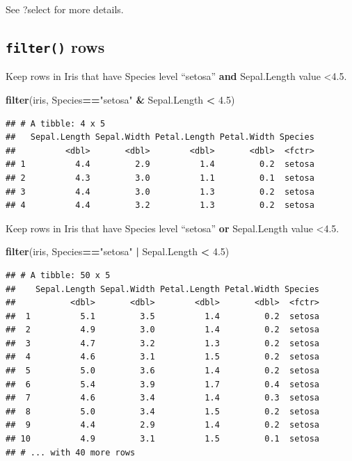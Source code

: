 \documentclass[]{book}
\newenvironment{Shaded}{\begin{snugshade}}{\end{snugshade}}
\newcommand{\KeywordTok}[1]{\textcolor[rgb]{0.13,0.29,0.53}{\textbf{#1}}}
\newcommand{\FloatTok}[1]{\textcolor[rgb]{0.00,0.00,0.81}{#1}}
\newcommand{\StringTok}[1]{\textcolor[rgb]{0.31,0.60,0.02}{#1}}
\newcommand{\OperatorTok}[1]{\textcolor[rgb]{0.81,0.36,0.00}{\textbf{#1}}}
\newcommand{\NormalTok}[1]{#1}
\begin{document}
See ?select for more details.

\subsection{\texorpdfstring{\texttt{filter()}
rows}{filter() rows}}\label{filter-rows}

Keep rows in Iris that have Species level ``setosa'' \textbf{and}
Sepal.Length value \textless{}4.5.

\begin{Shaded}
\begin{Highlighting}[]
\KeywordTok{filter}\NormalTok{(iris, Species}\OperatorTok{==}\StringTok{"setosa"} \OperatorTok{&}\StringTok{ }\NormalTok{Sepal.Length }\OperatorTok{<}\StringTok{ }\FloatTok{4.5}\NormalTok{)}
\end{Highlighting}
\end{Shaded}

\begin{verbatim}
## # A tibble: 4 x 5
##   Sepal.Length Sepal.Width Petal.Length Petal.Width Species
##          <dbl>       <dbl>        <dbl>       <dbl>  <fctr>
## 1          4.4         2.9          1.4         0.2  setosa
## 2          4.3         3.0          1.1         0.1  setosa
## 3          4.4         3.0          1.3         0.2  setosa
## 4          4.4         3.2          1.3         0.2  setosa
\end{verbatim}

Keep rows in Iris that have Species level ``setosa'' \textbf{or}
Sepal.Length value \textless{}4.5.

\begin{Shaded}
\begin{Highlighting}[]
\KeywordTok{filter}\NormalTok{(iris, Species}\OperatorTok{==}\StringTok{"setosa"} \OperatorTok{|}\StringTok{ }\NormalTok{Sepal.Length }\OperatorTok{<}\StringTok{ }\FloatTok{4.5}\NormalTok{)}
\end{Highlighting}
\end{Shaded}

\begin{verbatim}
## # A tibble: 50 x 5
##    Sepal.Length Sepal.Width Petal.Length Petal.Width Species
##           <dbl>       <dbl>        <dbl>       <dbl>  <fctr>
##  1          5.1         3.5          1.4         0.2  setosa
##  2          4.9         3.0          1.4         0.2  setosa
##  3          4.7         3.2          1.3         0.2  setosa
##  4          4.6         3.1          1.5         0.2  setosa
##  5          5.0         3.6          1.4         0.2  setosa
##  6          5.4         3.9          1.7         0.4  setosa
##  7          4.6         3.4          1.4         0.3  setosa
##  8          5.0         3.4          1.5         0.2  setosa
##  9          4.4         2.9          1.4         0.2  setosa
## 10          4.9         3.1          1.5         0.1  setosa
## # ... with 40 more rows
\end{verbatim}
\end{document}
